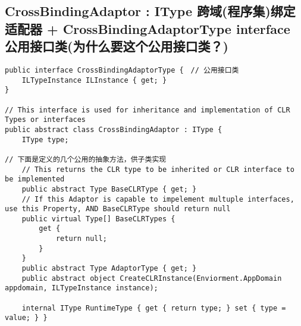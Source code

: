 \documentclass[9pt, b5paper]{article}
\begin{document}
\subsection{CrossBindingAdaptor : IType 跨域(程序集)绑定适配器 + CrossBindingAdaptorType interface 公用接口类(为什么要这个公用接口类？)}
\label{sec-5-1}
\begin{verbatim}
public interface CrossBindingAdaptorType {　// 公用接口类
    ILTypeInstance ILInstance { get; }
}

// This interface is used for inheritance and implementation of CLR Types or interfaces
public abstract class CrossBindingAdaptor : IType {
    IType type;

// 下面是定义的几个公用的抽象方法，供子类实现    
    // This returns the CLR type to be inherited or CLR interface to be implemented
    public abstract Type BaseCLRType { get; }
    // If this Adaptor is capable to impelement multuple interfaces, use this Property, AND BaseCLRType should return null
    public virtual Type[] BaseCLRTypes {
        get {
            return null;
        }
    }
    public abstract Type AdaptorType { get; }
    public abstract object CreateCLRInstance(Enviorment.AppDomain appdomain, ILTypeInstance instance);

    internal IType RuntimeType { get { return type; } set { type = value; } }


\end{verbatim}
\end{document}
